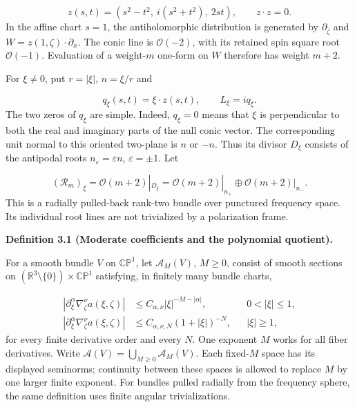 \documentclass[
  english,
  11pt,
  reqno]{amsart}
\makeatletter
\newcommand{\pandocstatementheading}[1]{%
  \par\addpenalty{\@beginparpenalty}%
  \addvspace{.5\baselineskip plus .2\baselineskip minus .2\baselineskip}%
  {\normalfont\bfseries #1\par}%
  \nobreak\@afterindenttrue\@afterheading
}
\makeatother
\begin{document}
\label{eq:online-root-conic} \[
z(s,t)=(s^2-t^2,\ i(s^2+t^2),\ 2st),
\qquad z\cdot z=0.
\] In the affine chart \(s=1\), the antiholomorphic distribution is
generated by \(\partial_{\bar\zeta}\) and
\(W=z(1,\zeta)\cdot\partial_x\). The conic line is \(\mathcal O(-2)\),
with its retained spin square root \(\mathcal O(-1)\). Evaluation of a
weight-\(m\) one-form on \(W\) therefore has weight \(m+2\).

For \(\xi\ne0\), put \(r=|\xi|\), \(n=\xi/r\) and

\label{eq:online-root-frequency-quadratic} \[
q_\xi(s,t)=\xi\cdot z(s,t),
\qquad L_\xi=iq_\xi.
\] The two zeros of \(q_\xi\) are simple. Indeed, \(q_\xi=0\) means that
\(\xi\) is perpendicular to both the real and imaginary parts of the
null conic vector. The corresponding unit normal to this oriented
two-plane is \(n\) or \(-n\). Thus its divisor \(D_\xi\) consists of the
antipodal roots \(n_\varepsilon=\varepsilon n\), \(\varepsilon=\pm1\).
Let

\label{eq:online-root-bundle} \[
(\mathcal R_m)_\xi=\mathcal O(m+2)|_{D_\xi}
=\mathcal O(m+2)|_{n_+}\oplus\mathcal O(m+2)|_{n_-}.
\] This is a radially pulled-back rank-two bundle over punctured
frequency space. Its individual root lines are not trivialized by a
polarization frame.

\pandocstatementheading{\leavevmode{}\label{def:online-moderate-root-coefficients}Definition 3.1 (Moderate coefficients and the polynomial quotient).}

For a smooth bundle \(V\) on \(\mathbb{CP}^1\), let \(\mathscr A_M(V)\),
\(M\ge0\), consist of smooth sections on
\((\mathbb R^3\setminus\{0\})\times\mathbb{CP}^1\) satisfying, in
finitely many bundle charts,

\label{eq:online-root-moderate-amplitude-estimates} \[
\begin{aligned}
|\partial_\xi^\alpha\nabla_\zeta^\nu a(\xi,\zeta)|
&\le C_{\alpha,\nu}|\xi|^{-M-|\alpha|},
&&0<|\xi|\le1,\\
|\partial_\xi^\alpha\nabla_\zeta^\nu a(\xi,\zeta)|
&\le C_{\alpha,\nu,N}(1+|\xi|)^{-N},
&&|\xi|\ge1,
\end{aligned}
\] for every finite derivative order and every \(N\). One exponent \(M\)
works for all fiber derivatives. Write
\(\mathscr A(V)=\bigcup_{M\ge0}\mathscr A_M(V)\). Each fixed-\(M\) space
has its displayed seminorms; continuity between these spaces is allowed
to replace \(M\) by one larger finite exponent. For bundles pulled
radially from the frequency sphere, the same definition uses finite
angular trivializations.
\end{document}
